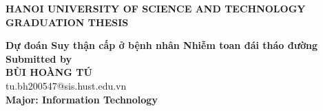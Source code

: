 \documentclass[main.tex]{subfiles}
\begin{document}
\begin{titlepage}
\thispagestyle{empty}
\begin{center}

{\textbf{\large{HANOI UNIVERSITY OF SCIENCE AND TECHNOLOGY}}}\\[4cm]

{\textbf{\huge{ GRADUATION THESIS}}}\\[1cm]
{\textbf{\Large{Dự đoán Suy thận cấp ở bệnh nhân Nhiễm toan đái tháo đường}}\\[1cm]


{\textbf{\large{Submitted by}}}\\[0.5cm]

{\textbf{\large{BÙI HOÀNG TÚ}}}\\
{\large{tu.bh200547@sis.hust.edu.vn}}\\[0.5cm]

{\textbf{\large{Major: Information Technology }}}\\

\vspace{2cm}
\begin{table}[H]
\centering
{}
\end{table}}
\end{center}



\end{titlepage}
\end{document}
